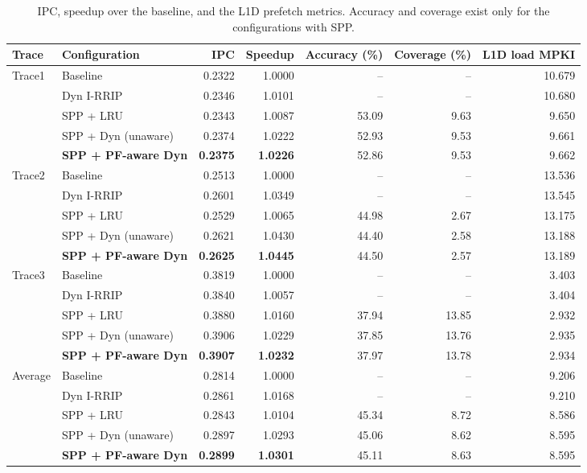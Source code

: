 \documentclass[11pt]{article}
\begin{document}
\begin{table}[H]
\centering
\small
\begin{adjustbox}{max width=\textwidth}
\begin{tabular}{llrrrrr}
\toprule
Trace & Configuration & IPC & Speedup & Accuracy (\%) & Coverage (\%) & L1D load MPKI \\
\midrule
Trace1 & Baseline & 0.2322 & 1.0000 & -- & -- & 10.679 \\
 & Dyn I-RRIP & 0.2346 & 1.0101 & -- & -- & 10.680 \\
 & SPP + LRU & 0.2343 & 1.0087 & 53.09 & 9.63 & 9.650 \\
 & SPP + Dyn (unaware) & 0.2374 & 1.0222 & 52.93 & 9.53 & 9.661 \\
 & \textbf{SPP + PF-aware Dyn} & \textbf{0.2375} & \textbf{1.0226} & 52.86 & 9.53 & 9.662 \\
\midrule
Trace2 & Baseline & 0.2513 & 1.0000 & -- & -- & 13.536 \\
 & Dyn I-RRIP & 0.2601 & 1.0349 & -- & -- & 13.545 \\
 & SPP + LRU & 0.2529 & 1.0065 & 44.98 & 2.67 & 13.175 \\
 & SPP + Dyn (unaware) & 0.2621 & 1.0430 & 44.40 & 2.58 & 13.188 \\
 & \textbf{SPP + PF-aware Dyn} & \textbf{0.2625} & \textbf{1.0445} & 44.50 & 2.57 & 13.189 \\
\midrule
Trace3 & Baseline & 0.3819 & 1.0000 & -- & -- & 3.403 \\
 & Dyn I-RRIP & 0.3840 & 1.0057 & -- & -- & 3.404 \\
 & SPP + LRU & 0.3880 & 1.0160 & 37.94 & 13.85 & 2.932 \\
 & SPP + Dyn (unaware) & 0.3906 & 1.0229 & 37.85 & 13.76 & 2.935 \\
 & \textbf{SPP + PF-aware Dyn} & \textbf{0.3907} & \textbf{1.0232} & 37.97 & 13.78 & 2.934 \\
\midrule
Average & Baseline & 0.2814 & 1.0000 & -- & -- & 9.206 \\
 & Dyn I-RRIP & 0.2861 & 1.0168 & -- & -- & 9.210 \\
 & SPP + LRU & 0.2843 & 1.0104 & 45.34 & 8.72 & 8.586 \\
 & SPP + Dyn (unaware) & 0.2897 & 1.0293 & 45.06 & 8.62 & 8.595 \\
 & \textbf{SPP + PF-aware Dyn} & \textbf{0.2899} & \textbf{1.0301} & 45.11 & 8.63 & 8.595 \\
\bottomrule
\end{tabular}
\end{adjustbox}
\caption{IPC, speedup over the baseline, and the L1D prefetch metrics. Accuracy and coverage
exist only for the configurations with SPP.}
\label{tab:main}
\end{table}
\end{document}
